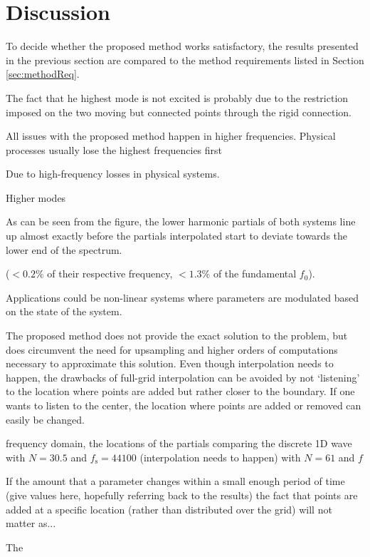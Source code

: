 \section{Discussion}
To decide whether the proposed method works satisfactory, the results presented in the previous section are compared to the method requirements listed in Section \eqref{sec:methodReq}. 

The fact that he highest mode is not excited is probably due to the restriction imposed on the two moving but connected points through the rigid connection.


All issues with the proposed method happen in higher frequencies. Physical processes usually lose the highest frequencies first

Due to high-frequency losses in physical systems. 

Higher modes

As can be seen from the figure, the lower harmonic partials of both systems line up almost exactly before the partials interpolated start to deviate towards the lower end of the spectrum.

($<0.2\%$ of their respective frequency, $<1.3\%$ of the fundamental $f_0$). 


Applications could be non-linear systems where parameters are modulated based on the state of the system. 

The proposed method does not provide the exact solution to the problem, but does circumvent the need for upsampling and higher orders of computations necessary to approximate this solution. Even though interpolation needs to happen, the drawbacks of full-grid interpolation can be avoided by not `listening' to the location where points are added but rather closer to the boundary. If one wants to listen to the center, the location where points are added or removed can easily be changed.


frequency domain, the locations of the partials comparing the discrete 1D wave with $N = 30.5$ and $f_\text{s} = 44100$ (interpolation needs to happen) with $N = 61$ and $f$ 

If the amount that a parameter changes within a small enough period of time (give values here, hopefully referring back to the results) the fact that points are added at a specific location (rather than distributed over the grid) will not matter as... 

The 

